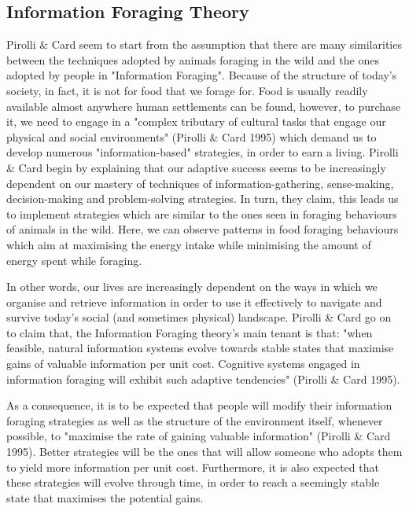 \documentclass{mproj}
\begin{document}
\subsection{Information Foraging Theory}

Pirolli \& Card seem to start from the assumption that there are many similarities between the techniques adopted by animals foraging in the wild and the ones adopted by people in "Information Foraging". Because of the structure of today's society, in fact, it is not for food that we forage for. Food is usually readily available almost anywhere  human settlements can be found, however, to purchase it, we need to engage in a "complex tributary of cultural tasks that engage our physical and social environments" (Pirolli \& Card  1995) which demand us to develop numerous "information-based" strategies, in order to earn a living. Pirolli \& Card begin by explaining that our adaptive success seems to be increasingly dependent on our mastery of techniques of information-gathering, sense-making, decision-making and problem-solving strategies. In turn, they claim, this leads us to implement strategies which are similar to the ones seen in foraging behaviours of animals in the wild. Here, we can observe patterns in food foraging behaviours which aim at maximising the energy intake while minimising the amount of energy spent while foraging. 

In other words, our lives are increasingly dependent on the ways in which we organise and retrieve information in order to use it effectively to navigate and survive today's social (and sometimes physical) landscape. Pirolli \& Card go on to claim that, the Information Foraging theory's main tenant is that:  "when feasible, natural information systems evolve towards stable states that maximise gains of valuable information per unit cost. Cognitive systems engaged in information foraging will exhibit such adaptive tendencies" (Pirolli \& Card  1995). 

As a consequence, it is to be expected that people will modify their information foraging strategies as well as the structure of the environment itself, whenever possible, to "maximise the rate of gaining valuable information" (Pirolli \& Card  1995). Better strategies will be the ones that will allow someone who adopts them to yield more information per unit cost. Furthermore, it is also expected that these strategies will evolve through time, in order to reach a seemingly stable state that maximises the potential gains. 
\end{document}
